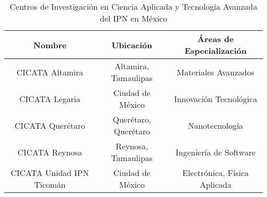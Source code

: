 \begin{table}[h]
    \centering
    \caption{Centros de Investigación en Ciencia Aplicada y Tecnología Avanzada del IPN en México}
    \vspace{0.3cm}
    \begin{tabular}{ccc}
        \hline
        \textbf{Nombre} & \textbf{Ubicación} & \textbf{Áreas de Especialización} \\ \hline
        CICATA Altamira & Altamira, Tamaulipas & Materiales Avanzados \\
        CICATA Legaria & Ciudad de México & Innovación Tecnológica \\
        CICATA Querétaro & Querétaro, Querétaro & Nanotecnología \\ 
        CICATA Reynosa & Reynosa, Tamaulipas & Ingeniería de Software \\ 
        CICATA Unidad IPN Ticomán & Ciudad de México & Electrónica, Física Aplicada \\ \hline
    \end{tabular}
    \label{tab:cicata-loc}
\end{table}
